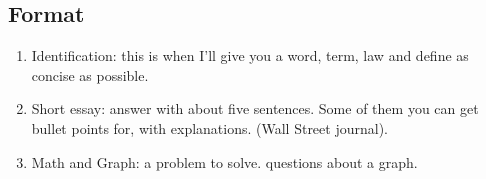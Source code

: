 \subsection*{Format}

\begin{enumerate}[label = \textbullet]
	\item Identification: this is when I'll give you a word, term, law and define as concise as possible.

	\item Short essay: answer with about five sentences. Some of them you can get bullet points for, with explanations. (Wall Street journal).

	\item Math and Graph: a problem to solve. questions about a graph.
\end{enumerate}

